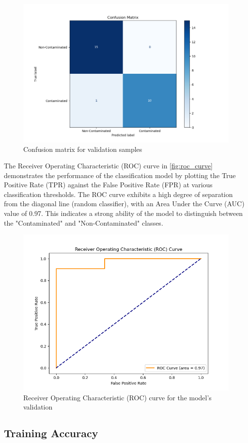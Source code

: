 \documentclass[12pt]{report}
\begin{document}
\begin{figure}[!h]
    \centering
    \includegraphics[width=0.75\linewidth]{Images/bb.png}
    \caption{Confusion matrix for validation samples}
    \label{fig:conf_matrix}
\end{figure}

The Receiver Operating Characteristic (ROC) curve in \autoref{fig:roc_curve} demonstrates the performance of the classification model by plotting the True Positive Rate (TPR) against the False Positive Rate (FPR) at various classification thresholds. The ROC curve exhibits a high degree of separation from the diagonal line (random classifier), with an Area Under the Curve (AUC) value of 0.97. This indicates a strong ability of the model to distinguish between the "Contaminated" and "Non-Contaminated" classes.

\begin{figure}[!h]
    \centering
    \includegraphics[width=0.75\linewidth]{Images/cc.png}
    \caption{Receiver Operating Characteristic (ROC) curve for the model's validation}
    \label{fig:roc_curve}
\end{figure}

\subsection{Training Accuracy}
\end{document}
